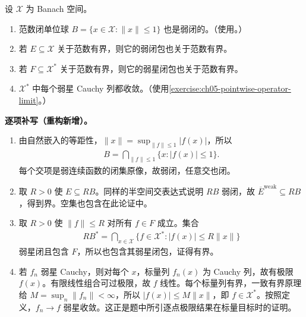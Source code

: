 \documentclass[../../main.tex]{subfiles}
\begin{document}
\begin{exercise}\label{exercise:ch05-weak-closures-completeness}
设 $\mathcal X$ 为 Banach 空间。
\begin{enumerate}
\item\label{item:ch05-unit-ball-weakly-closed} 范数闭单位球 $B=\{x\in\mathcal X:\|x\|\le1\}$ 也是弱闭的。（使用。）
\item\label{item:ch05-bounded-weak-closure} 若 $E\subseteq\mathcal X$ 关于范数有界，则它的弱闭包也关于范数有界。
\item\label{item:ch05-bounded-weak-star-closure} 若 $F\subseteq\mathcal X^*$ 关于范数有界，则它的弱星闭包也关于范数有界。
\item\label{item:ch05-weak-star-sequential-completeness} $\mathcal X^*$ 中每个弱星 Cauchy 列都收敛。（使用\cref{exercise:ch05-pointwise-operator-limit}。）
\end{enumerate}
\end{exercise}
\begin{solution}
\textbf{逐项补写（重构新增）。}
\begin{enumerate}
\item 由自然嵌入的等距性，$\|x\|=\sup_{\|f\|\le1}|f(x)|$，所以
\begin{align*}
B=\bigcap_{\|f\|\le1}\{x:|f(x)|\le1\}.
\end{align*}
每个交项是弱连续函数的闭集原像，故弱闭，任意交也闭。
\item 取 $R>0$ 使 $E\subseteq RB$。同样的半空间交表达式说明 $RB$ 弱闭，故 $\overline E^{\mathrm{weak}}\subseteq RB$，得到界。空集也包含在此论证中。
\item 取 $R>0$ 使 $\|f\|\le R$ 对所有 $f\in F$ 成立。集合
\begin{align*}
RB^*=\bigcap_{x\in\mathcal X}\{f\in\mathcal X^*:|f(x)|\le R\|x\|\}
\end{align*}
弱星闭且包含 $F$，所以也包含其弱星闭包，证得有界。
\item 若 $f_n$ 弱星 Cauchy，则对每个 $x$，标量列 $f_n(x)$ 为 Cauchy 列，故有极限 $f(x)$。有限线性组合可过极限，故 $f$ 线性。每个标量列有界，一致有界原理给 $M=\sup_n\|f_n\|<\infty$，所以 $|f(x)|\le M\|x\|$，即 $f\in\mathcal X^*$。按照定义，$f_n\to f$ 弱星收敛。这正是题中所引逐点极限结果在标量目标时的证明。
\end{enumerate}
\end{solution}
\end{document}

